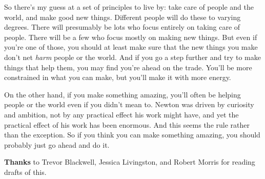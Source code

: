 So there's my guess at a set of principles to live by: take care of
people and the world, and make good new things. Different people will do
these to varying degrees. There will presumably be lots who focus
entirely on taking care of people. There will be a few who focus mostly
on making new things. But even if you're one of those, you should at
least make sure that the new things you make don't net \emph{harm}
people or the world. And if you go a step further and try to make things
that help them, you may find you're ahead on the trade. You'll be more
constrained in what you can make, but you'll make it with more energy.

On the other hand, if you make something amazing, you'll often be
helping people or the world even if you didn't mean to. Newton was
driven by curiosity and ambition, not by any practical effect his work
might have, and yet the practical effect of his work has been enormous.
And this seems the rule rather than the exception. So if you think you
can make something amazing, you should probably just go ahead and do it.


\textbf{Thanks} to Trevor Blackwell, Jessica Livingston, and Robert
Morris for reading drafts of this.